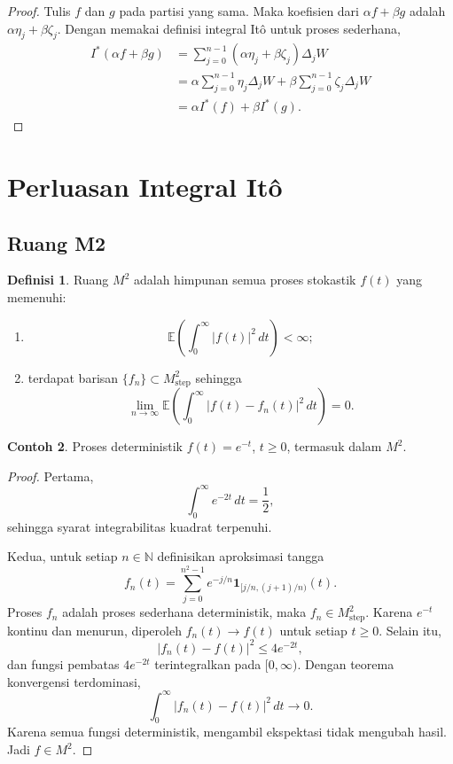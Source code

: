 \documentclass[12pt,a4paper]{article}
\theoremstyle{definition}
\newtheorem{definisi}{Definisi}[section]
\newtheorem{contoh}[definisi]{Contoh}
\theoremstyle{plain}
\newcommand{\E}{\mathbb{E}}
\newcommand{\N}{\mathbb{N}}
\newcommand{\ind}{\mathbf{1}}
\begin{document}
\begin{proof}
  Tulis $f$ dan $g$ pada partisi yang sama. Maka koefisien dari
  $\alpha f+\beta g$ adalah $\alpha\eta_j+\beta\zeta_j$. Dengan memakai definisi
  integral It\^o untuk proses sederhana,
  \begin{align*}
    I^\ast(\alpha f+\beta g)
     & =
    \sum_{j=0}^{n-1}(\alpha\eta_j+\beta\zeta_j)\Delta_jW \\
     & =
    \alpha\sum_{j=0}^{n-1}\eta_j\Delta_jW
    +
    \beta\sum_{j=0}^{n-1}\zeta_j\Delta_jW                \\
     & =
    \alpha I^\ast(f)+\beta I^\ast(g).
  \end{align*}
\end{proof}

\section{Perluasan Integral It\^o}

\subsection{Ruang M2}

\begin{definisi}
  Ruang $M^2$ adalah himpunan semua proses stokastik $f(t)$ yang memenuhi:
  \begin{enumerate}[label=\arabic*.]
    \item
          \[
            \E\left(\int_0^\infty |f(t)|^2\,dt\right)<\infty;
          \]
    \item terdapat barisan $\{f_n\}\subset M_{\mathrm{step}}^2$ sehingga
          \[
            \lim_{n\to\infty}
            \E\left(\int_0^\infty |f(t)-f_n(t)|^2\,dt\right)=0.
          \]
  \end{enumerate}
\end{definisi}

\begin{contoh}
  Proses deterministik $f(t)=e^{-t}$, $t\ge 0$, termasuk dalam $M^2$.
\end{contoh}

\begin{proof}
  Pertama,
  \[
    \int_0^\infty e^{-2t}\,dt=\frac12,
  \]
  sehingga syarat integrabilitas kuadrat terpenuhi.

  Kedua, untuk setiap $n\in\N$ definisikan aproksimasi tangga
  \[
    f_n(t)
    =
    \sum_{j=0}^{n^2-1}e^{-j/n}\ind_{[j/n,(j+1)/n)}(t).
  \]
  Proses $f_n$ adalah proses sederhana deterministik, maka $f_n\in
    M_{\mathrm{step}}^2$. Karena $e^{-t}$ kontinu dan menurun, diperoleh
  $f_n(t)\to f(t)$ untuk setiap $t\ge 0$. Selain itu,
  \[
    |f_n(t)-f(t)|^2\le 4e^{-2t},
  \]
  dan fungsi pembatas $4e^{-2t}$ terintegralkan pada $[0,\infty)$. Dengan
  teorema konvergensi terdominasi,
  \[
    \int_0^\infty |f_n(t)-f(t)|^2\,dt\to 0.
  \]
  Karena semua fungsi deterministik, mengambil ekspektasi tidak mengubah hasil.
  Jadi $f\in M^2$.
\end{proof}
\end{document}

